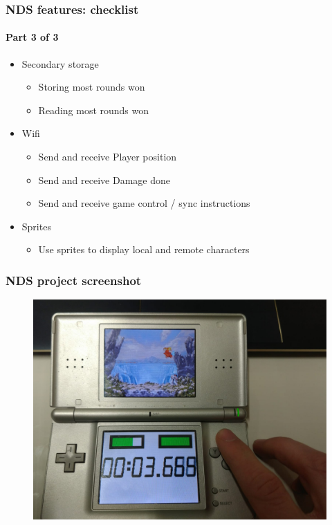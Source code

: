 \documentclass{beamer}
\begin{document}
\begin{frame}
    \frametitle{NDS features: checklist}
    \framesubtitle{Part 3 of 3}

    \begin{itemize}
        \item Secondary storage
              \begin{itemize}
                  \item Storing most rounds won
                  \item Reading most rounds won
              \end{itemize}
        \item Wifi
              \begin{itemize}
                  \item Send and receive Player position
                  \item Send and receive Damage done
                  \item Send and receive game control / sync instructions
              \end{itemize}
        \item Sprites
              \begin{itemize}
                  \item Use sprites to display local and remote characters
              \end{itemize}

    \end{itemize}

\end{frame}


\begin{frame}
    \frametitle{NDS project screenshot}
    \begin{figure}
        \includegraphics[width=\textwidth]{imgs/example.jpeg}
    \end{figure}
\end{frame}
\end{document}
